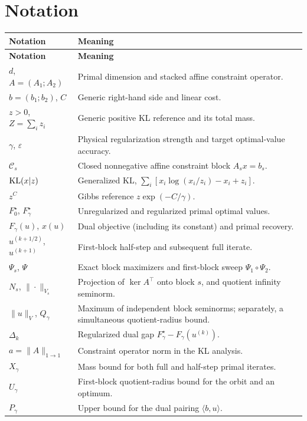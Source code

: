\section{Notation}\label{app:notation}
\begingroup
\renewcommand{\arraystretch}{1.1}
\begin{longtable}{@{}p{}p{}@{}}
\toprule\textbf{Notation}&\textbf{Meaning}\\\midrule\endfirsthead
\toprule\textbf{Notation}&\textbf{Meaning}\\\midrule\endhead
$d$, $A=(A_1;A_2)$ & Primal dimension and stacked affine constraint operator.\\
$b=(b_1;b_2)$, $C$ & Generic right-hand side and linear cost.\\
$z>0$, $Z=\sum_i z_i$ & Generic positive KL reference and its total mass.\\
$\gamma$, $\varepsilon$ & Physical regularization strength and target optimal-value accuracy.\\
$\mathcal C_s$ & Closed nonnegative affine constraint block $A_sx=b_s$.\\
$\mathrm{KL}(x|z)$ & Generalized KL, $\sum_i[x_i\log(x_i/z_i)-x_i+z_i]$.\\
$z^C$ & Gibbs reference $z\exp(-C/\gamma)$.\\
$F_0^\star$, $F_\gamma^\star$ & Unregularized and regularized primal optimal values.\\
$F_\gamma(u)$, $x(u)$ & Dual objective (including its constant) and primal recovery.\\
$u^{(k+1/2)}$, $u^{(k+1)}$ & First-block half-step and subsequent full iterate.\\
$\Psi_s$, $\Psi$ & Exact block maximizers and first-block sweep $\Psi_1\circ\Psi_2$.\\
$N_s$, $\|\cdot\|_{V_s}$ & Projection of $\ker A^\top$ onto block $s$, and quotient infinity seminorm.\\
$\|u\|_V$, $Q_\gamma$ & Maximum of independent block seminorms; separately, a simultaneous quotient-radius bound.\\
$\Delta_k$ & Regularized dual gap $F_\gamma^\star-F_\gamma(u^{(k)})$.\\
$a=\|A\|_{1\to1}$ & Constraint operator norm in the KL analysis.\\
$X_\gamma$ & Mass bound for both full and half-step primal iterates.\\
$U_\gamma$ & First-block quotient-radius bound for the orbit and an optimum.\\
$P_\gamma$ & Upper bound for the dual pairing $\langle b,u\rangle$.\\

\end{longtable}
